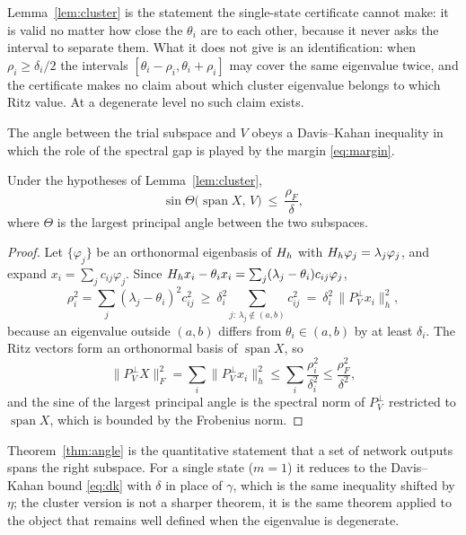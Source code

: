 Lemma~\ref{lem:cluster} is the statement the single-state certificate cannot
make: it is valid no matter how close the $\theta_i$ are to each other,
because it never asks the interval to separate them. What it does not give is
an identification: when $\rho_i\ge\delta_i/2$ the intervals
$[\theta_i-\rho_i,\theta_i+\rho_i]$ may cover the same eigenvalue twice, and
the certificate makes no claim about which cluster eigenvalue belongs to
which Ritz value. At a degenerate level no such claim exists.

The angle between the trial subspace and $V$ obeys a Davis--Kahan inequality
in which the role of the spectral gap is played by the margin
\eqref{eq:margin}.

\begin{theorem}\label{thm:angle}
  Under the hypotheses of Lemma~\ref{lem:cluster},
  \[
    \sin\Theta\big(\operatorname{span}X,\,V\big)\ \le\ \frac{\rho_F}{\delta},
  \]
  where $\Theta$ is the largest principal angle between the two subspaces.
\end{theorem}
\begin{proof}
  Let $\{\varphi_j\}$ be an orthonormal eigenbasis of $H_h$ with
  $H_h\varphi_j=\lambda_j\varphi_j$, and expand
  $x_i=\sum_j c_{ij}\varphi_j$. Since $H_h x_i-\theta_i x_i
  =\sum_j(\lambda_j-\theta_i)c_{ij}\varphi_j$,
  \[
    \rho_i^2=\sum_j(\lambda_j-\theta_i)^2c_{ij}^2
    \ \ge\ \delta_i^2\!\!\sum_{j:\,\lambda_j\notin(a,b)}\!\! c_{ij}^2
    \ =\ \delta_i^2\,\big\lVert P_V^{\perp}x_i\big\rVert_h^2 ,
  \]
  because an eigenvalue outside $(a,b)$ differs from $\theta_i\in(a,b)$ by at
  least $\delta_i$. The Ritz vectors form an orthonormal basis of
  $\operatorname{span}X$, so
  \[
    \big\lVert P_V^{\perp}X\big\rVert_F^2
    =\sum_i\big\lVert P_V^{\perp}x_i\big\rVert_h^2
    \le\sum_i\frac{\rho_i^2}{\delta_i^2}
    \le\frac{\rho_F^2}{\delta^2},
  \]
  and the sine of the largest principal angle is the spectral norm of
  $P_V^{\perp}$ restricted to $\operatorname{span}X$, which is bounded by the
  Frobenius norm.
\end{proof}

Theorem~\ref{thm:angle} is the quantitative statement that a set of network
outputs spans the right subspace. For a single state ($m=1$) it reduces to
the Davis--Kahan bound \eqref{eq:dk} with $\delta$ in place of $\gamma$, which
is the same inequality shifted by $\eta$; the cluster version is not a
sharper theorem, it is the same theorem applied to the object that remains
well defined when the eigenvalue is degenerate.

